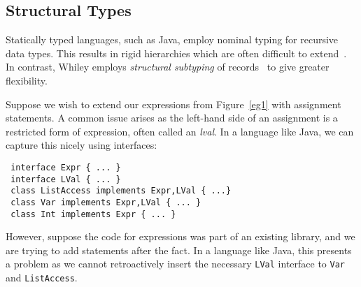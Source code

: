 %
%
%
%

\subsection{Structural Types}
Statically typed languages, such as Java, employ nominal typing for
recursive data types.  This results in rigid hierarchies which are
often difficult to extend~\cite{MA08}.  In contrast, Whiley employs
{\em structural subtyping} of records~\cite{Card88} to give greater
flexibility.

Suppose we wish to extend our expressions from Figure~\ref{eg1} with
assignment statements.  A common issue arises as the left-hand side of
an assignment is a restricted form of expression, often called an {\em
  lval}.  In a language like Java, we can capture this nicely using
interfaces:
\begin{lstlisting}
 interface Expr { ... }
 interface LVal { ... }
 class ListAccess implements Expr,LVal { ...}
 class Var implements Expr,LVal { ... }
 class Int implements Expr { ... }
\end{lstlisting}
However, suppose the code for expressions was part of an existing
library, and we are trying to add statements after the fact.  In a
language like Java, this presents a problem as we cannot
retroactively insert the necessary \lstinline{LVal} interface to
\lstinline{Var} and \lstinline{ListAccess}.

